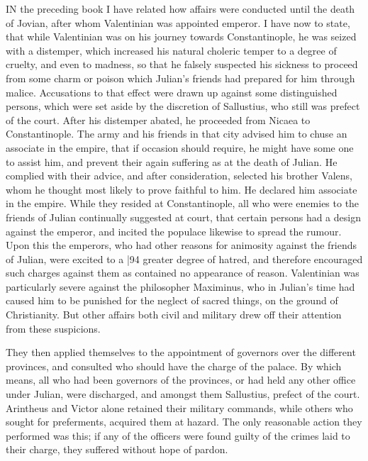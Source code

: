 IN the preceding book I have related how affairs were conducted until the death of Jovian, after whom Valentinian was appointed emperor. I have now to state, that while Valentinian was on his journey towards Constantinople, he was seized with a distemper, which increased his natural choleric temper to a degree of cruelty, and even to madness, so that he falsely suspected his sickness to proceed from some charm or poison which Julian's friends had prepared for him through malice. Accusations to that effect were drawn up against some distinguished persons, which were set aside by the discretion of Sallustius, who still was prefect of the court. After his distemper abated, he proceeded from Nicaea to Constantinople. The army and his friends in that city advised him to chuse an associate in the empire, that if occasion should require, he might have some one to assist him, and prevent their again suffering as at the death of Julian. He complied with their advice, and after consideration, selected his brother Valens, whom he thought most likely to prove faithful to him. He declared him associate in the empire. While they resided at Constantinople, all who were enemies to the friends of Julian continually suggested at court, that certain persons had a design against the emperor, and incited the populace likewise to spread the rumour. Upon this the emperors, who had other reasons for animosity against the friends of Julian, were excited to a
|94 greater degree of hatred, and therefore encouraged such charges against them as contained no appearance of reason. Valentinian was particularly severe against the philosopher Maximinus, who in Julian's time had caused him to be punished for the neglect of sacred things, on the ground of Christianity. But other affairs both civil and military drew off their attention from these suspicions.

They then applied themselves to the appointment of governors over the different provinces, and consulted who should have the charge of the palace. By which means, all who had been governors of the provinces, or had held any other office under Julian, were discharged, and amongst them Sallustius, prefect of the court. Arintheus and Victor alone retained their military commands, while others who sought for preferments, acquired them at hazard. The only reasonable action they performed was this; if any of the officers were found guilty of the crimes laid to their charge, they suffered
without hope of pardon.

